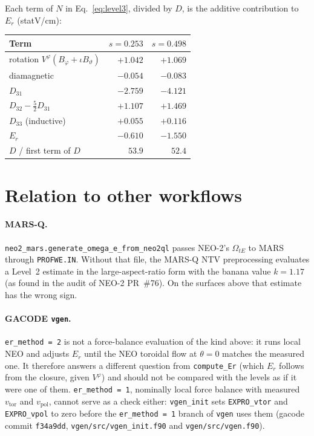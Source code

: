 \documentclass[11pt]{article}
\newcommand{\tht}{\vartheta}
\newcommand{\ph}{\varphi}
\newcommand{\code}[1]{\texttt{#1}}
\begin{document}
Each term of $N$ in Eq.~\eqref{eq:level3}, divided by $D$, is the additive
contribution to $E_r$ (statV/cm):

\begin{center}
\begin{tabular}{lrr}
  \toprule
  Term & $s = 0.253$ & $s = 0.498$ \\
  \midrule
  rotation $V^\ph(B_\ph + \iota B_\tht)$ & $+1.042$ & $+1.069$ \\
  diamagnetic                           & $-0.054$ & $-0.083$ \\
  $D_{31}$                              & $-2.759$ & $-4.121$ \\
  $D_{32} - \frac52 D_{31}$             & $+1.107$ & $+1.469$ \\
  $D_{33}$ (inductive)                  & $+0.055$ & $+0.116$ \\
  \midrule
  $E_r$                                 & $-0.610$ & $-1.550$ \\
  $D$ / first term of $D$               & $53.9$   & $52.4$ \\
  \bottomrule
\end{tabular}
\end{center}

\section{Relation to other workflows}

\paragraph{MARS-Q.}  \code{neo2\_mars.generate\_omega\_e\_from\_neo2ql}
passes NEO-2's $\Omega_{tE}$ to MARS through \code{PROFWE.IN}.  Without
that file, the MARS-Q NTV preprocessing evaluates a Level~2 estimate in the
large-aspect-ratio form with the banana value $k = 1.17$ (as found in the
audit of NEO-2 PR~\#76).  On the surfaces above that estimate has the wrong
sign.

\paragraph{GACODE \code{vgen}.}  \code{er\_method = 2} is not a force-balance
evaluation of the kind above: it runs local NEO and adjusts $E_r$ until the
NEO toroidal flow at $\theta = 0$ matches the measured one.  It therefore
answers a different question from \code{compute\_Er} (which $E_r$ follows from
the closure, given $V^\ph$) and should not be compared with the levels as if
it were one of them.  \code{er\_method = 1}, nominally local force balance with
measured $v_\mathrm{tor}$ and $v_\mathrm{pol}$, cannot serve as a check
either: \code{vgen\_init} sets \code{EXPRO\_vtor} and \code{EXPRO\_vpol} to
zero before the \code{er\_method = 1} branch of \code{vgen} uses them
(gacode commit \code{f34a9dd}, \code{vgen/src/vgen\_init.f90} and
\code{vgen/src/vgen.f90}).
\end{document}

